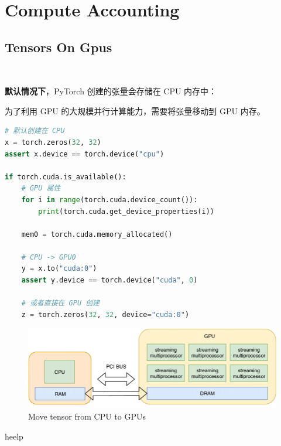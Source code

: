 \clearpage

{\chaptoc
  \section*{Compute Accounting}
}


\subsection{Tensors On Gpus}~{}


\textbf{默认情况下}，PyTorch 创建的张量会存储在 CPU 内存中：

为了利用 GPU 的大规模并行计算能力，需要将张量移动到 GPU 内存。

\begin{lstlisting}[language=Python]
# 默认创建在 CPU
x = torch.zeros(32, 32)
assert x.device == torch.device("cpu")

if torch.cuda.is_available():
    # GPU 属性
    for i in range(torch.cuda.device_count()):
        print(torch.cuda.get_device_properties(i))

    mem0 = torch.cuda.memory_allocated()

    # CPU -> GPU0
    y = x.to("cuda:0")
    assert y.device == torch.device("cuda", 0)

    # 或者直接在 GPU 创建
    z = torch.zeros(32, 32, device="cuda:0")
\end{lstlisting}

\begin{figure}[htbp]
  \centering
  \includegraphics[width=0.9\linewidth]{figs/lec2/lec2.40.png}
  \caption{Move tensor from CPU to GPUs}
\end{figure}

heelp
\par




